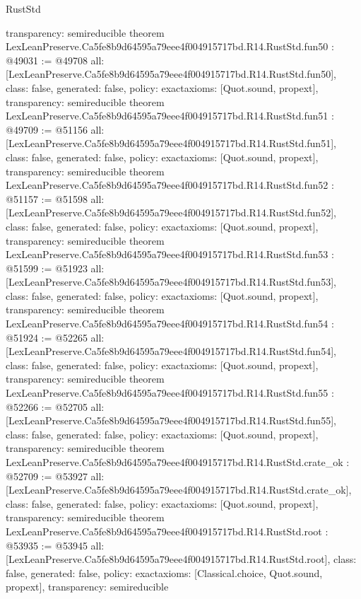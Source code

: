 \begin{lexlean}{RustStd}
\begin{coremodule}
{  transparency: semireducible
}
theorem LexLeanPreserve.Ca5fe8b9d64595a79eee4f004915717bd.R14.RustStd.fun50 : @49031 := @49708 {
  all: [LexLeanPreserve.Ca5fe8b9d64595a79eee4f004915717bd.R14.RustStd.fun50],
  class: false,
  generated: false,
  policy: exact{axioms: [Quot.sound, propext]},
  transparency: semireducible
}
theorem LexLeanPreserve.Ca5fe8b9d64595a79eee4f004915717bd.R14.RustStd.fun51 : @49709 := @51156 {
  all: [LexLeanPreserve.Ca5fe8b9d64595a79eee4f004915717bd.R14.RustStd.fun51],
  class: false,
  generated: false,
  policy: exact{axioms: [Quot.sound, propext]},
  transparency: semireducible
}
theorem LexLeanPreserve.Ca5fe8b9d64595a79eee4f004915717bd.R14.RustStd.fun52 : @51157 := @51598 {
  all: [LexLeanPreserve.Ca5fe8b9d64595a79eee4f004915717bd.R14.RustStd.fun52],
  class: false,
  generated: false,
  policy: exact{axioms: [Quot.sound, propext]},
  transparency: semireducible
}
theorem LexLeanPreserve.Ca5fe8b9d64595a79eee4f004915717bd.R14.RustStd.fun53 : @51599 := @51923 {
  all: [LexLeanPreserve.Ca5fe8b9d64595a79eee4f004915717bd.R14.RustStd.fun53],
  class: false,
  generated: false,
  policy: exact{axioms: [Quot.sound, propext]},
  transparency: semireducible
}
theorem LexLeanPreserve.Ca5fe8b9d64595a79eee4f004915717bd.R14.RustStd.fun54 : @51924 := @52265 {
  all: [LexLeanPreserve.Ca5fe8b9d64595a79eee4f004915717bd.R14.RustStd.fun54],
  class: false,
  generated: false,
  policy: exact{axioms: [Quot.sound, propext]},
  transparency: semireducible
}
theorem LexLeanPreserve.Ca5fe8b9d64595a79eee4f004915717bd.R14.RustStd.fun55 : @52266 := @52705 {
  all: [LexLeanPreserve.Ca5fe8b9d64595a79eee4f004915717bd.R14.RustStd.fun55],
  class: false,
  generated: false,
  policy: exact{axioms: [Quot.sound, propext]},
  transparency: semireducible
}
theorem LexLeanPreserve.Ca5fe8b9d64595a79eee4f004915717bd.R14.RustStd.crate_ok : @52709 := @53927 {
  all: [LexLeanPreserve.Ca5fe8b9d64595a79eee4f004915717bd.R14.RustStd.crate_ok],
  class: false,
  generated: false,
  policy: exact{axioms: [Quot.sound, propext]},
  transparency: semireducible
}
theorem LexLeanPreserve.Ca5fe8b9d64595a79eee4f004915717bd.R14.RustStd.root : @53935 := @53945 {
  all: [LexLeanPreserve.Ca5fe8b9d64595a79eee4f004915717bd.R14.RustStd.root],
  class: false,
  generated: false,
  policy: exact{axioms: [Classical.choice, Quot.sound, propext]},
  transparency: semireducible
}


\end{coremodule}
\end{lexlean}
